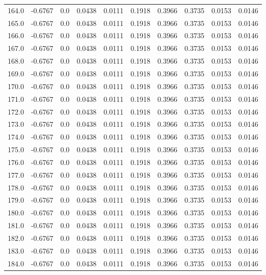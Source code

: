 \begin{longtable}{lrrrrrrrrr}
164.0 & -0.6767 & 0.0 & 0.0438 & 0.0111 & 0.1918 & 0.3966 & 0.3735 & 0.0153 & 0.0146 \\
165.0 & -0.6767 & 0.0 & 0.0438 & 0.0111 & 0.1918 & 0.3966 & 0.3735 & 0.0153 & 0.0146 \\
166.0 & -0.6767 & 0.0 & 0.0438 & 0.0111 & 0.1918 & 0.3966 & 0.3735 & 0.0153 & 0.0146 \\
167.0 & -0.6767 & 0.0 & 0.0438 & 0.0111 & 0.1918 & 0.3966 & 0.3735 & 0.0153 & 0.0146 \\
168.0 & -0.6767 & 0.0 & 0.0438 & 0.0111 & 0.1918 & 0.3966 & 0.3735 & 0.0153 & 0.0146 \\
169.0 & -0.6767 & 0.0 & 0.0438 & 0.0111 & 0.1918 & 0.3966 & 0.3735 & 0.0153 & 0.0146 \\
170.0 & -0.6767 & 0.0 & 0.0438 & 0.0111 & 0.1918 & 0.3966 & 0.3735 & 0.0153 & 0.0146 \\
171.0 & -0.6767 & 0.0 & 0.0438 & 0.0111 & 0.1918 & 0.3966 & 0.3735 & 0.0153 & 0.0146 \\
172.0 & -0.6767 & 0.0 & 0.0438 & 0.0111 & 0.1918 & 0.3966 & 0.3735 & 0.0153 & 0.0146 \\
173.0 & -0.6767 & 0.0 & 0.0438 & 0.0111 & 0.1918 & 0.3966 & 0.3735 & 0.0153 & 0.0146 \\
174.0 & -0.6767 & 0.0 & 0.0438 & 0.0111 & 0.1918 & 0.3966 & 0.3735 & 0.0153 & 0.0146 \\
175.0 & -0.6767 & 0.0 & 0.0438 & 0.0111 & 0.1918 & 0.3966 & 0.3735 & 0.0153 & 0.0146 \\
176.0 & -0.6767 & 0.0 & 0.0438 & 0.0111 & 0.1918 & 0.3966 & 0.3735 & 0.0153 & 0.0146 \\
177.0 & -0.6767 & 0.0 & 0.0438 & 0.0111 & 0.1918 & 0.3966 & 0.3735 & 0.0153 & 0.0146 \\
178.0 & -0.6767 & 0.0 & 0.0438 & 0.0111 & 0.1918 & 0.3966 & 0.3735 & 0.0153 & 0.0146 \\
179.0 & -0.6767 & 0.0 & 0.0438 & 0.0111 & 0.1918 & 0.3966 & 0.3735 & 0.0153 & 0.0146 \\
180.0 & -0.6767 & 0.0 & 0.0438 & 0.0111 & 0.1918 & 0.3966 & 0.3735 & 0.0153 & 0.0146 \\
181.0 & -0.6767 & 0.0 & 0.0438 & 0.0111 & 0.1918 & 0.3966 & 0.3735 & 0.0153 & 0.0146 \\
182.0 & -0.6767 & 0.0 & 0.0438 & 0.0111 & 0.1918 & 0.3966 & 0.3735 & 0.0153 & 0.0146 \\
183.0 & -0.6767 & 0.0 & 0.0438 & 0.0111 & 0.1918 & 0.3966 & 0.3735 & 0.0153 & 0.0146 \\
184.0 & -0.6767 & 0.0 & 0.0438 & 0.0111 & 0.1918 & 0.3966 & 0.3735 & 0.0153 & 0.0146 \\

\end{longtable}
